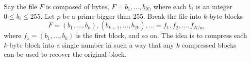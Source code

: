 \documentclass[12pt]{article}
\newcommand{\integers}{\mathbb{Z}}
\begin{document}

\noindent Say the file $F$ is composed of bytes, $F = b_1, \ldots, b_N$, where each $b_i$ is an integer $0\leq b_i\leq 255$. Let $p$ be a prime bigger than 255. Break the file into $k$-byte blocks
\[
F = (b_1, \ldots, b_k), (b_{k+1}, \ldots, b_{2k}), \ldots = f_1, f_2, \ldots, f_{N/m}
\]
where $f_1 = (b_1, \ldots, b_k)$ is the first block, and so on. The idea is to compress each $k$-byte block into a single number in such a way that any $k$ compressed blocks can be used to recover the original block.\\
\end{document}

